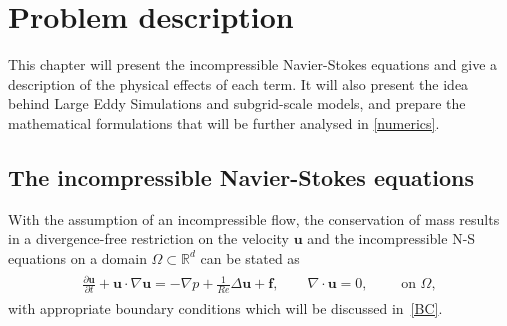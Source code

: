 
\chapter{Problem description} %

\label{description} %


This chapter will present the incompressible Navier-Stokes equations and give a 
description of the physical effects of each term. It will also present the idea behind Large Eddy Simulations and
subgrid-scale models, and prepare the mathematical formulations that will be further analysed in \cref{numerics}.

\section{The incompressible Navier-Stokes equations}

With the assumption of an incompressible flow, the conservation of mass 
results in a divergence-free restriction on the velocity $\mathbf{u}$
and the incompressible N-S equations on a domain $\Omega\subset\mathbb{R}^d$ can be stated as  
%
\begin{align}
    \begin{split}
    \frac{\partial \mathbf{u}}{\partial t} + \mathbf{u}\cdot \nabla\mathbf{u} = 
    -\nabla p + \frac{1}{Re} \Delta\mathbf{u} + \mathbf{f}, \qquad 
    \nabla \cdot \mathbf{u} = 0, \qquad \text{ on } \Omega,
    \end{split}
    \label{eq:NS}
\end{align}
%
with appropriate boundary conditions which will be discussed in~\cref{BC}.

